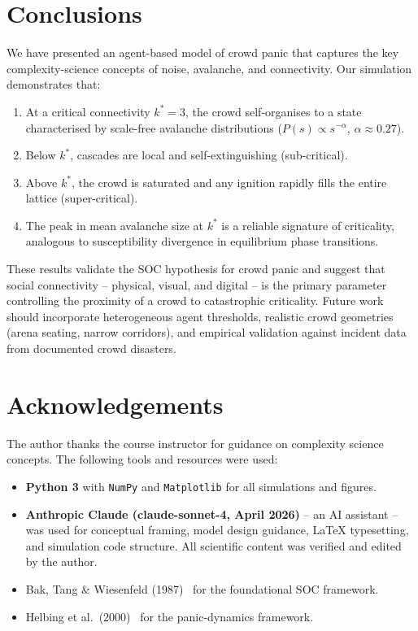 \documentclass[12pt, a4paper]{article}
\begin{document}
\section{Conclusions}
\label{sec:conclusions}

We have presented an agent-based model of crowd panic that captures the key
complexity-science concepts of noise, avalanche, and connectivity.  Our simulation
demonstrates that:
\begin{enumerate}
  \item At a critical connectivity $k^*=3$, the crowd self-organises to a state
        characterised by scale-free avalanche distributions
        ($P(s)\propto s^{-\alpha}$, $\alpha\approx 0.27$).
  \item Below $k^*$, cascades are local and self-extinguishing (sub-critical).
  \item Above $k^*$, the crowd is saturated and any ignition rapidly fills the
        entire lattice (super-critical).
  \item The peak in mean avalanche size at $k^*$ is a reliable signature of
        criticality, analogous to susceptibility divergence in equilibrium phase
        transitions.
\end{enumerate}

These results validate the SOC hypothesis for crowd panic and suggest that social
connectivity -- physical, visual, and digital -- is the primary parameter
controlling the proximity of a crowd to catastrophic criticality.  Future work
should incorporate heterogeneous agent thresholds, realistic crowd geometries
(arena seating, narrow corridors), and empirical validation against incident data
from documented crowd disasters.

\section*{Acknowledgements}

The author thanks the course instructor for guidance on complexity science
concepts.  The following tools and resources were used:

\begin{itemize}
  \item \textbf{Python 3} with \texttt{NumPy} and \texttt{Matplotlib} for
        all simulations and figures.
  \item \textbf{Anthropic Claude (claude-sonnet-4, April 2026)} -- an AI
        assistant -- was used for conceptual framing, model design guidance,
        LaTeX typesetting, and simulation code structure.  All scientific
        content was verified and edited by the author.
  \item Bak, Tang \& Wiesenfeld (1987)~\cite{bak1987} for the foundational SOC
        framework.
  \item Helbing et al.\ (2000)~\cite{helbing2000} for the panic-dynamics framework.
\end{itemize}
\end{document}
